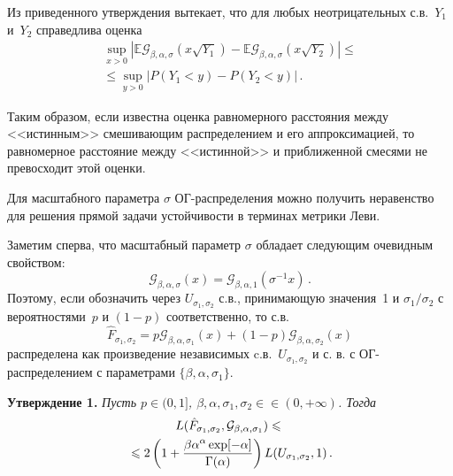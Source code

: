 \begin{multicols}{2}
Из приведенного утверждения вытекает, что для любых
неотрицательных с.в.\ $Y_1$ и~$Y_2$ справедлива оценка
\begin{multline*}
\sup\limits_{x>0} \left\vert {\mathbb E}{\mathcal
G}_{\beta,\alpha,\sigma}(x\sqrt{Y_1})-{\mathbb E}{\mathcal
G}_{\beta,\alpha,\sigma}(x\sqrt{Y_2}) \right\vert \leqslant {}\\
{}\leqslant
\sup\limits_{y>0} \left\vert P(Y_1<y) - P(Y_2<y) \right\vert\,.
\end{multline*}

Таким образом, если известна оценка равномерного расстояния между
<<истинным>> смешивающим распределением и его аппроксимацией, то
равномерное расстояние между <<истинной>> и приближенной смесями
не превосходит этой оценки.

Для масштабного параметра $\sigma$ ОГ-рас\-пре\-де\-ле\-ния можно получить
неравенство для решения прямой задачи устойчивости в терминах
метрики Леви.

Заметим сперва, что масштабный параметр $\sigma$ обладает
следующим очевидным свойством:
$$
{\mathcal G}_{\beta,\alpha,\sigma}(x) = {\mathcal
G}_{\beta,\alpha,1}(\sigma^{-1} x)\,.
$$
Поэтому, если обозначить через $U_{\sigma_1,\sigma_2}$ с.в.,
принимающую значения~1 и $\sigma_1/\sigma_2$ с вероятностями~$p$ и
$(1-p)$ соответственно, то с.в.\
$$\hat F_{\sigma_1,\sigma_2} = p {\mathcal G}_{\beta,\alpha,\sigma_1}(x) + 
(1-p){\mathcal G}_{\beta,\alpha,\sigma_2}(x)$$
распределена как произведение независимых c.в.\
$U_{\sigma_1,\sigma_2}$ и с. в. с ОГ-рас\-пре\-де\-ле\-ни\-ем с параметрами
$\{\beta,\alpha,\sigma_1\}$.

\medskip

\noindent
\textbf{Утверждение 1.}
\textit{Пусть $p\in(0,1]$, $\beta,\alpha,\sigma_1,\sigma_2 \in$\linebreak $\in
(0,+\infty)$. Тогда}
\begin{multline}
L(\hat F_{\sigma_1,\sigma_2}, {\mathcal G}_{\beta,\alpha,\sigma_1}
) \leqslant{}\\
{}\leqslant
2\left(1+\displaystyle\frac{\displaystyle \beta\alpha^{\alpha}\exp[-\alpha]\mathstrut}{\displaystyle \Gamma(\alpha)\mathstrut}\right)
L( U_{\sigma_1,\sigma_2},1)\,. 
\label{stab7a}
\end{multline}


\smallskip



\end{multicols}

